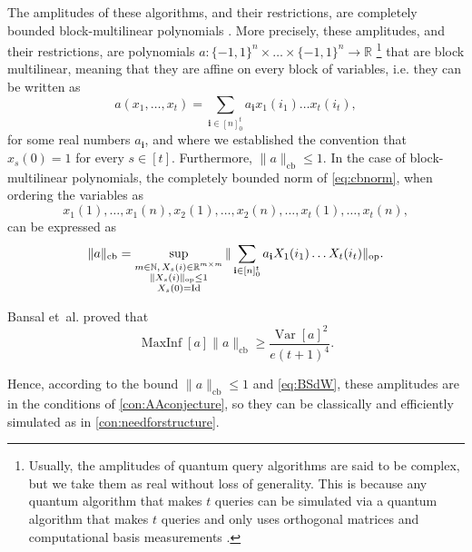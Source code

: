 \documentclass[11pt]{article}
\DeclareMathOperator{\var}{Var}
\DeclareMathOperator{\maxinf}{MaxInf}
\DeclareMathOperator{\cb}{cb}
\DeclareMathOperator{\op}{op}
\newcommand{\norm}[1]{\|#1\|}
\newcommand{\R}{\mathbb{R}} %
\newcommand{\N}{\mathbb{N}} %
\newcommand{\1}{\mathbf{1}}
\newcommand{\Id}{\ensuremath{\mathop{\rm Id}\nolimits}}
\newcommand{\ind}[1]{\mathbf{#1}}
\theoremstyle{plain}
\theoremstyle{definition}
\theoremstyle{remark}
\begin{document}
The amplitudes of these algorithms, and their restrictions, are completely bounded block-multilinear polynomials \cite{QQA=CBF}. More precisely, these amplitudes, and their restrictions, are polynomials $a:\{-1,1\}^n\times\dots\times \{-1,1\}^n\to\R$ \footnote{Usually, the amplitudes of quantum query algorithms are said to be complex, but we take them as real without loss of generality. This is because any quantum algorithm that makes $t$ queries can be simulated via a quantum algorithm that makes $t$ queries and only uses orthogonal matrices and computational basis measurements \cite{mckague2009simulating}.} that are block multilinear, meaning that they are affine on every block of variables, i.e. they can be written as 
\begin{equation*}
    a(x_1,\dots,x_t)=\sum_{\ind i \in [n]^t_0}a_{\ind i} x_1(i_1)\dots x_t(i_t),
\end{equation*}
for some real numbers $a_\ind i$, and where we established the convention that $x_s(0)=1$ for every $s\in [t].$
Furthermore, $\|a\|_{\cb}\leq 1$. In the case of block-multilinear polynomials, the completely bounded norm of \cref{eq:cbnorm}, when ordering the variables as $$x_1(1),\dots,x_1(n),x_2(1),\dots,x_2(n),\dots,x_t(1),\dots,x_t(n),$$ can be expressed as
\begin{equation}\label{eq:bmcbnorm}
    \norm{a}_{\cb}=\sup_{\substack{m\in\N,\, X_s(i)\in\R^{m\times m}\\ \norm{X_s(i)}_{\op}\leq 1\\ X_s(0)=\Id}} \norm{\sum_{\ind i \in [n]^t_0}a_{\ind i} X_1(i_1)\dots X_t(i_t)}_{\op}.
\end{equation}

Bansal et\ al. proved that
\begin{equation}\label{eq:BSdW}
    \maxinf [a]\norm{a}_{\cb}\geq \frac{\var[a]^2}{e(t+1)^4}.
\end{equation}

Hence, according to the bound $\|a\|_{\cb}\leq 1$ and \cref{eq:BSdW}, these amplitudes are in the conditions of \cref{con:AAconjecture}, so they can be classically and efficiently simulated as in \cref{con:needforstructure}.  
\end{document}
